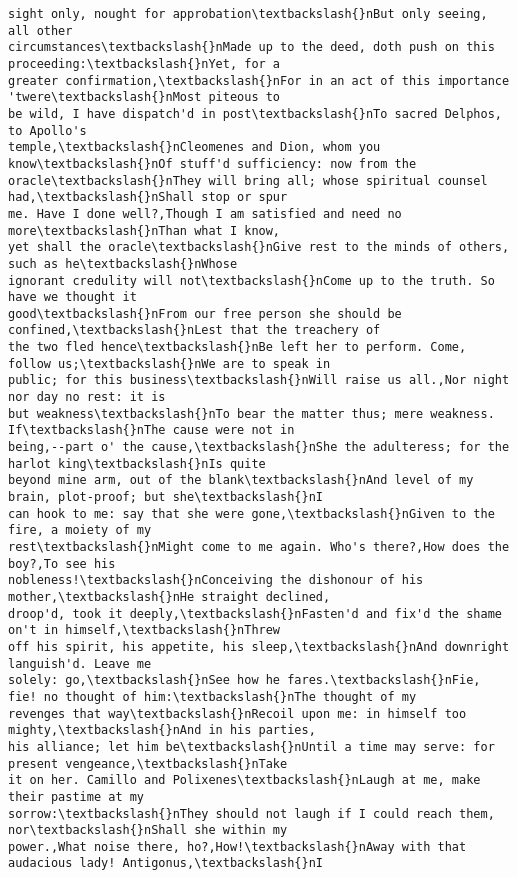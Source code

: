 \documentclass[11pt]{article}
\begin{document}
\begin{tcolorbox}[breakable, size=fbox, boxrule=.5pt, pad at break*=1mm, opacityfill=0]
\begin{Verbatim}[commandchars=\\\{\}]
sight only, nought for approbation\textbackslash{}nBut only seeing, all other
circumstances\textbackslash{}nMade up to the deed, doth push on this proceeding:\textbackslash{}nYet, for a
greater confirmation,\textbackslash{}nFor in an act of this importance 'twere\textbackslash{}nMost piteous to
be wild, I have dispatch'd in post\textbackslash{}nTo sacred Delphos, to Apollo's
temple,\textbackslash{}nCleomenes and Dion, whom you know\textbackslash{}nOf stuff'd sufficiency: now from the
oracle\textbackslash{}nThey will bring all; whose spiritual counsel had,\textbackslash{}nShall stop or spur
me. Have I done well?,Though I am satisfied and need no more\textbackslash{}nThan what I know,
yet shall the oracle\textbackslash{}nGive rest to the minds of others, such as he\textbackslash{}nWhose
ignorant credulity will not\textbackslash{}nCome up to the truth. So have we thought it
good\textbackslash{}nFrom our free person she should be confined,\textbackslash{}nLest that the treachery of
the two fled hence\textbackslash{}nBe left her to perform. Come, follow us;\textbackslash{}nWe are to speak in
public; for this business\textbackslash{}nWill raise us all.,Nor night nor day no rest: it is
but weakness\textbackslash{}nTo bear the matter thus; mere weakness. If\textbackslash{}nThe cause were not in
being,--part o' the cause,\textbackslash{}nShe the adulteress; for the harlot king\textbackslash{}nIs quite
beyond mine arm, out of the blank\textbackslash{}nAnd level of my brain, plot-proof; but she\textbackslash{}nI
can hook to me: say that she were gone,\textbackslash{}nGiven to the fire, a moiety of my
rest\textbackslash{}nMight come to me again. Who's there?,How does the boy?,To see his
nobleness!\textbackslash{}nConceiving the dishonour of his mother,\textbackslash{}nHe straight declined,
droop'd, took it deeply,\textbackslash{}nFasten'd and fix'd the shame on't in himself,\textbackslash{}nThrew
off his spirit, his appetite, his sleep,\textbackslash{}nAnd downright languish'd. Leave me
solely: go,\textbackslash{}nSee how he fares.\textbackslash{}nFie, fie! no thought of him:\textbackslash{}nThe thought of my
revenges that way\textbackslash{}nRecoil upon me: in himself too mighty,\textbackslash{}nAnd in his parties,
his alliance; let him be\textbackslash{}nUntil a time may serve: for present vengeance,\textbackslash{}nTake
it on her. Camillo and Polixenes\textbackslash{}nLaugh at me, make their pastime at my
sorrow:\textbackslash{}nThey should not laugh if I could reach them, nor\textbackslash{}nShall she within my
power.,What noise there, ho?,How!\textbackslash{}nAway with that audacious lady! Antigonus,\textbackslash{}nI

\end{Verbatim}
\end{tcolorbox}
\end{document}
